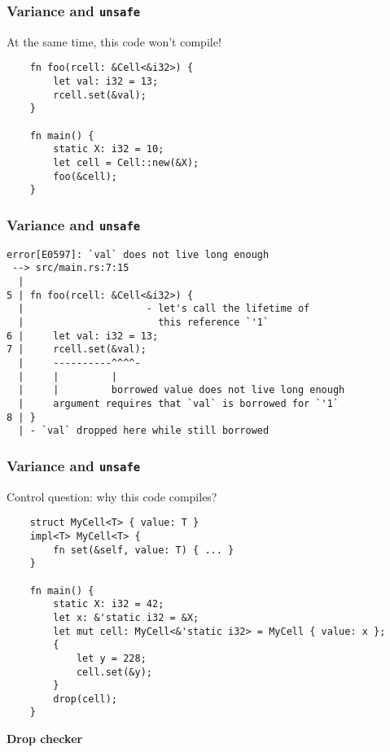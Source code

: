 \documentclass[aspectratio=1610,t]{beamer}
\begin{document}
\begin{frame}[fragile]
\frametitle{Variance and \texttt{unsafe}}
At the same time, this code won't compile!

\begin{verbatim}
    fn foo(rcell: &Cell<&i32>) { 
        let val: i32 = 13;
        rcell.set(&val);
    }

    fn main() {
        static X: i32 = 10;
        let cell = Cell::new(&X);
        foo(&cell);
    }
\end{verbatim}
\end{frame}


\begin{frame}[fragile]
\frametitle{Variance and \texttt{unsafe}}
\begin{verbatim}
error[E0597]: `val` does not live long enough
 --> src/main.rs:7:15
  |
5 | fn foo(rcell: &Cell<&i32>) {
  |                     - let's call the lifetime of
  |                       this reference `'1`
6 |     let val: i32 = 13;
7 |     rcell.set(&val);
  |     ----------^^^^-
  |     |         |
  |     |         borrowed value does not live long enough
  |     argument requires that `val` is borrowed for `'1`
8 | }
  | - `val` dropped here while still borrowed
\end{verbatim}
\end{frame}


\begin{frame}[fragile]
\frametitle{Variance and \texttt{unsafe}}
Control question: why this code compiles?

\begin{verbatim}
    struct MyCell<T> { value: T }
    impl<T> MyCell<T> {
        fn set(&self, value: T) { ... }
    }

    fn main() {
        static X: i32 = 42;
        let x: &'static i32 = &X;
        let mut cell: MyCell<&'static i32> = MyCell { value: x };
        {
            let y = 228;
            cell.set(&y);
        }
        drop(cell);
    }
\end{verbatim}
\end{frame}


\begin{frame}[c]
\centering\Huge\textbf{Drop checker}
\end{frame}
\end{document}
